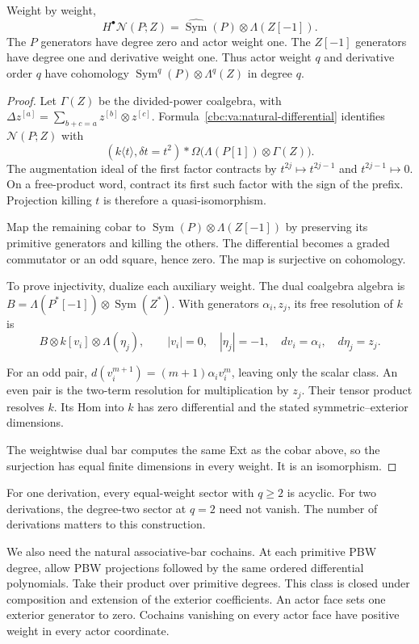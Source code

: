 \begin{lemma}\label{cbc:va:natural-cohomology}
Weight by weight,
\[
 H^\bullet\mathcal N(P;Z)
   =\widehat{\operatorname{Sym}}(P)
                         \otimes\Lambda(Z[-1]).
\]
The $P$ generators have degree zero and actor
weight one. The $Z[-1]$ generators have
degree one and derivative weight one.
Thus actor weight $q$ and derivative order
$q$ have cohomology
$\operatorname{Sym}^q(P)\otimes\Lambda^q(Z)$
in degree $q$.
\end{lemma}
\begin{proof}
Let $\Gamma(Z)$ be the divided-power coalgebra,
with $\Delta z^{[a]}=\sum_{b+c=a}
z^{[b]}\otimes z^{[c]}$.
Formula~\eqref{cbc:va:natural-differential}
identifies $\mathcal N(P;Z)$ with
\[
 (k\langle t\rangle,\delta t=t^2)
        *\Omega\bigl(\Lambda(P[1])\otimes\Gamma(Z)\bigr).
\]
The augmentation ideal of the first factor
contracts by $t^{2j}\mapsto t^{2j-1}$ and
$t^{2j-1}\mapsto0$.
On a free-product word, contract its first
such factor with the sign of the prefix.
Projection killing $t$ is therefore a
quasi-isomorphism.

Map the remaining cobar to
$\operatorname{Sym}(P)\otimes\Lambda(Z[-1])$
by preserving its primitive generators and
killing the others. The differential becomes
a graded commutator or an odd square, hence
zero. The map is surjective on cohomology.

To prove injectivity, dualize each auxiliary
weight. The dual coalgebra algebra is
$B=\Lambda(P^*[-1])\otimes\operatorname{Sym}(Z^*)$.
With generators $\alpha_i,z_j$, its free
resolution of $k$ is
\[
 B\otimes k[v_i]\otimes\Lambda(\eta_j),
 \qquad |v_i|=0,\quad|\eta_j|=-1,\quad
 dv_i=\alpha_i,\quad d\eta_j=z_j.
\]

For an odd pair,
$d(v_i^{m+1})=(m+1)\alpha_i v_i^m$,
leaving only the scalar class.
An even pair is the two-term resolution
for multiplication by $z_j$.
Their tensor product resolves $k$.
Its Hom into $k$ has zero differential and
the stated symmetric--exterior dimensions.

The weightwise dual bar computes the same
Ext as the cobar above, so the surjection
has equal finite dimensions in every weight.
It is an isomorphism.
\end{proof}

For one derivation, every equal-weight sector
with $q\geq2$ is acyclic. For two derivations,
the degree-two sector at $q=2$ need not vanish.
The number of derivations matters to this
construction.

We also need the natural associative-bar
cochains. At each primitive PBW degree,
allow PBW projections followed by the same
ordered differential polynomials. Take their
product over primitive degrees.
This class is closed under composition and
extension of the exterior coefficients.
An actor face sets one exterior generator
to zero. Cochains vanishing on every actor
face have positive weight in every actor
coordinate.

